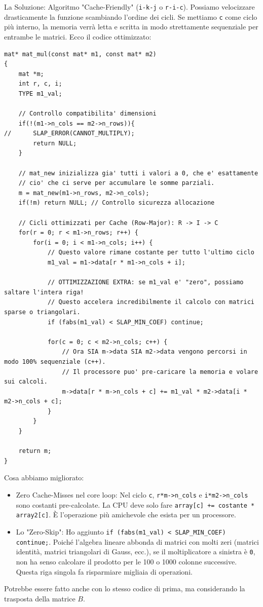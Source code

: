 \documentclass[10pt]{article}
\begin{document}
La Soluzione: Algoritmo "Cache-Friendly" (\texttt{i-k-j} o \texttt{r-i-c}).
Possiamo velocizzare drasticamente la funzione scambiando l'ordine dei cicli. Se mettiamo \texttt{c} come ciclo più interno, la memoria verrà letta e scritta in modo strettamente sequenziale per entrambe le matrici.
Ecco il codice ottimizzato:
\begin{lstlisting}
mat* mat_mul(const mat* m1, const mat* m2)
{
	mat *m;
	int r, c, i;
	TYPE m1_val;

	// Controllo compatibilita' dimensioni
	if(!(m1->n_cols == m2->n_rows)){
//		SLAP_ERROR(CANNOT_MULTIPLY);
		return NULL;
	}

	// mat_new inizializza gia' tutti i valori a 0, che e' esattamente
	// cio' che ci serve per accumulare le somme parziali.
	m = mat_new(m1->n_rows, m2->n_cols); 
	if(!m) return NULL; // Controllo sicurezza allocazione

	// Cicli ottimizzati per Cache (Row-Major): R -> I -> C
	for(r = 0; r < m1->n_rows; r++) {
		for(i = 0; i < m1->n_cols; i++) {
			// Questo valore rimane costante per tutto l'ultimo ciclo
			m1_val = m1->data[r * m1->n_cols + i]; 
			
			// OTTIMIZZAZIONE EXTRA: se m1_val e' "zero", possiamo saltare l'intera riga!
			// Questo accelera incredibilmente il calcolo con matrici sparse o triangolari.
			if (fabs(m1_val) < SLAP_MIN_COEF) continue; 
			
			for(c = 0; c < m2->n_cols; c++) {
				// Ora SIA m->data SIA m2->data vengono percorsi in modo 100% sequenziale (c++).
				// Il processore puo' pre-caricare la memoria e volare sui calcoli.
				m->data[r * m->n_cols + c] += m1_val * m2->data[i * m2->n_cols + c];
			}
		}
	}
	
	return m;
}
\end{lstlisting}
Cosa abbiamo migliorato:
\begin{itemize}
\item    Zero Cache-Misses nel core loop: Nel ciclo \texttt{c}, \texttt{r*m->n\_cols} e \texttt{i*m2->n\_cols} sono costanti pre-calcolate. La CPU deve solo fare \texttt{array[c] += costante * array2[c]}. È l'operazione più amichevole che esista per un processore.
\item    Lo "Zero-Skip": Ho aggiunto \texttt{if (fabs(m1\_val) < SLAP\_MIN\_COEF) continue;}. Poiché l'algebra lineare abbonda di matrici con molti zeri (matrici identità, matrici triangolari di Gauss, ecc.), se il moltiplicatore a sinistra è \texttt{0}, non ha senso calcolare il prodotto per le 100 o 1000 colonne successive. Questa riga singola fa risparmiare migliaia di operazioni.
\end{itemize}
Potrebbe essere fatto anche con lo stesso codice di prima, ma considerando la trasposta della matrice $B$.
\end{document}
